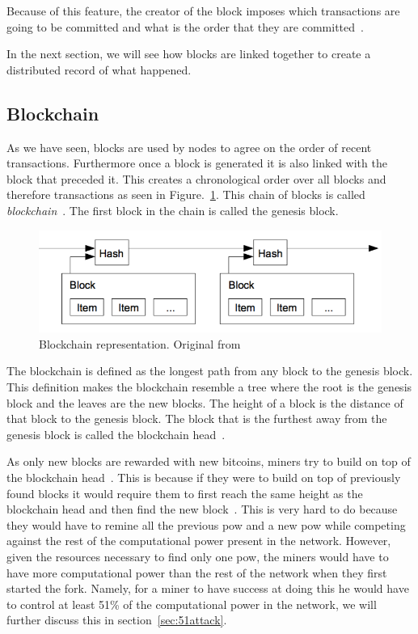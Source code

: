 Because of this feature, the creator of the block imposes which transactions are going to be committed and what is the order that they are committed~\cite{decker2013information}.

In the next section, we will see how blocks are linked together to create a distributed record of what happened.

\subsection{Blockchain}
\label{sec:blockchain}
As we have seen, blocks are used by nodes to agree on the order of recent transactions. Furthermore once a block is generated it is also linked with the block that preceded it. This creates a chronological order over all blocks and therefore transactions as seen in Figure.~\ref{fig:blocks}. This chain of blocks is called \textit{blockchain}~\cite{decker2013information}. The first block in the chain is called the genesis block.

\begin{figure}[h]
\centering
\includegraphics[scale=0.65]{figs/orderBlocks}
\caption{Blockchain representation. Original from~\protect\cite{nakamoto2008bitcoin}}
\label{fig:blocks}
\end{figure}

The blockchain is defined as the longest path from any block to the genesis block. This definition makes the blockchain resemble a tree where the root is the genesis block and the leaves are the new blocks. The height of a block is the distance of that block to the genesis block. The block that is the furthest away from the genesis block is called the blockchain head~\cite{decker2013information}.

As only new blocks are rewarded with new bitcoins, miners try to build on top of the blockchain head~\cite{decker2013information}. This is because if they were to build on top of previously found blocks it would require them to first reach the same height as the blockchain head and then find the new block~\cite{nakamoto2008bitcoin}. This is very hard to do because they would have to remine all the previous \acrshort{pow} and a new \acrshort{pow} while competing against the rest of the computational power present in the network. However, given the resources necessary to find only one \acrshort{pow}, the miners would have to have more computational power than the rest of the network when they first started the fork. Namely, for a miner to have success at doing this he would have to control at least 51\% of the computational power in the network, we will further discuss this in section~\ref{sec:51attack}.

